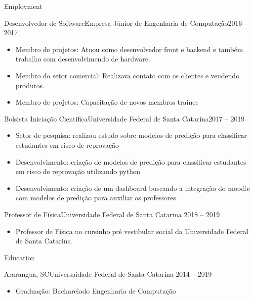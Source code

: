 \documentclass[]{mcdowellcv}
\begin{document}
	\makeheader
	
	\begin{cvsection}{Employment}
		\begin{cvsubsection}{Desenvolvedor de Software}{Empresa Júnior de Engenharia de Computação}{2016 -- 2017}
			~\\
			\begin{itemize}
				\item Membro de projetos: Atuou como desenvolvedor front e backend e também trabalho com desenvolvimendo de hardware.
				\item Membro do setor comercial: Realizava contato com os clientes e vendendo produtos.
				\item Membro de projetos: Capacitação de novos membros trainee
			\end{itemize}
		\end{cvsubsection}
		
		\begin{cvsubsection}{Bolsista Iniciação Cientifica}{Universidade Federal de Santa Catarina}{2017 -- 2019}
			~\\
			\begin{itemize}
				\item Setor de pesquisa: realizou estudo sobre modelos de predição para classificar estudantes em risco de reprovação
				\item Desenvolvimento: criação de modelos de predição para classificar estudantes em risco de reprovação utilizando python
				\item Desenvolvimento: criação de um dashboard buscando a integração do moodle com modelos de predição para auxiliar os professores.
			\end{itemize}
		\end{cvsubsection}
		
		\begin{cvsubsection}{Professor de Física}{Universidade Federal de Santa Catarina}{ 2018 -- 2019}	
			~\\			
			\begin{itemize}
				\item Professor de Física no cursinho pré vestibular social da Universidade Federal de Santa Catarina.
			\end{itemize}
		\end{cvsubsection}
		
		
	\end{cvsection}
	
	\begin{cvsection}{Education}
		\begin{cvsubsection}{Ararangua, SC}{Universaidade Federal de Santa Catarina}{ 2014 -- 2019}
			~\\
			\begin{itemize}
				\item Graduação: Bacharelado Engenharia de Computação 
			\end{itemize}
		\end{cvsubsection}
	\end{cvsection}
	
\end{document}
